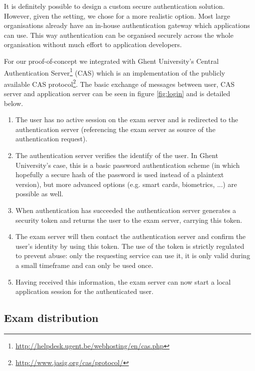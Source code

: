 \documentclass[12pt]{article}
\begin{document}
It is definitely possible to design a custom secure authentication solution.
However, given the setting, we chose for a more realistic option. Most large
organisations already have an in-house authentication gateway which applications
can use. This way authentication can be organised securely across the whole
organisation without much effort to application developers.

For our proof-of-concept we integrated with Ghent University's Central
Authentication
Server\footnote{\url{http://helpdesk.ugent.be/webhosting/en/cas.php}} (CAS)
which is an implementation of the publicly available CAS
protocol\footnote{\url{http://www.jasig.org/cas/protocol/}}. The basic exchange
of messages between user, CAS server and application server can be seen in
figure \ref{fig:login} and is detailed below.

\begin{enumerate}

\item The user has no active session on the exam server and is redirected to the
authentication server (referencing the exam server as source of the
authentication request).

\item The authentication server verifies the identify of the user. In Ghent
University's case, this is a basic password authentication scheme (in which
hopefully a secure hash of the password is used instead of a plaintext version),
but more advanced options (e.g. smart cards, biometrics, ...) are possible as
well.

\item When authentication has succeeded the authentication server generates a
security token and returns the user to the exam server, carrying this token.

\item The exam server will then contact the authentication server and confirm
the user's identity by using this token. The use of the token is strictly
regulated to prevent abuse: only the requesting service can use it, it is only
valid during a small timeframe and can only be used once.

\item Having received this information, the exam server can now start a local
application session for the authenticated user.

\end{enumerate}

\subsection{Exam distribution}
\label{subsec:impl-exams}
\end{document}
